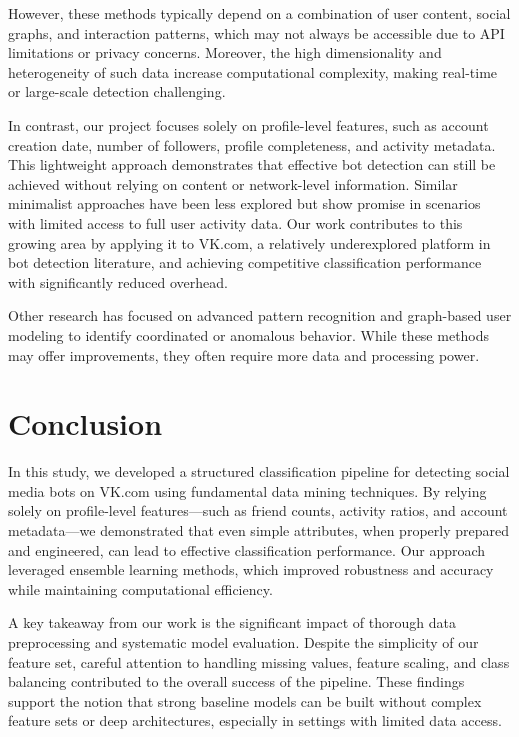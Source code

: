 \documentclass[conference]{IEEEtran}
\begin{document}
However, these methods typically depend on a combination of user content, social graphs, and interaction patterns, which may not always be accessible due to API limitations or privacy concerns. Moreover, the high dimensionality and heterogeneity of such data increase computational complexity, making real-time or large-scale detection challenging.

In contrast, our project focuses solely on profile-level features, such as account creation date, number of followers, profile completeness, and activity metadata. This lightweight approach demonstrates that effective bot detection can still be achieved without relying on content or network-level information. Similar minimalist approaches have been less explored but show promise in scenarios with limited access to full user activity data. Our work contributes to this growing area by applying it to VK.com, a relatively underexplored platform in bot detection literature, and achieving competitive classification performance with significantly reduced overhead.


Other research has focused on advanced pattern recognition and graph-based user modeling to identify coordinated or anomalous behavior. While these methods may offer improvements, they often require more data and processing power.

\section{Conclusion}

In this study, we developed a structured classification pipeline for detecting social media bots on VK.com using fundamental data mining techniques. By relying solely on profile-level features—such as friend counts, activity ratios, and account metadata—we demonstrated that even simple attributes, when properly prepared and engineered, can lead to effective classification performance. Our approach leveraged ensemble learning methods, which improved robustness and accuracy while maintaining computational efficiency.

A key takeaway from our work is the significant impact of thorough data preprocessing and systematic model evaluation. Despite the simplicity of our feature set, careful attention to handling missing values, feature scaling, and class balancing contributed to the overall success of the pipeline. These findings support the notion that strong baseline models can be built without complex feature sets or deep architectures, especially in settings with limited data access.
\end{document}
